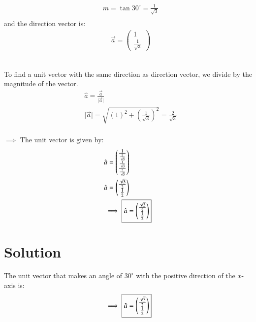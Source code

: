 \documentclass[journal,12pt,twocolumn]{IEEEtran}
\begin{document}
 \begin{align*}
& m = \tan{30^{\circ}} = \frac{1}{\sqrt{3}}\\ 
\end{align*}
and the direction vector is:
 \begin{align*}
& \vec{a}  = \begin{pmatrix} 1 \\ \frac{1}{\sqrt{3}} \end{pmatrix}
\end{align*}


\\


To find a unit vector with the same direction as direction vector, we divide by the magnitude of the vector.
 \begin{align*}
& \hat{a}  = \frac{\vec{a}}{\lvert \vec{a} \rvert}\\
& \lvert \vec{a} \rvert  = \sqrt{ \left( 1 \right)^{\!\!2} +  \left( \frac{1}{\sqrt{3}} \right)^{\!\!2}} = \frac{2}{\sqrt{3}}
\end{align*}
\\
$\implies$ The unit vector is given by:
 \begin{align*}
 & \hat{a}  = \begin{pmatrix}
\frac{1}{\frac{2}{\sqrt{3}}}\\
\frac{\frac{1}{\sqrt{3}}}{\frac{2}{\sqrt{3}}}
\end{pmatrix}\\
& \hat{a}  = \begin{pmatrix}
\frac{\sqrt{3}}{2}\\
\frac{1}{2}
\end{pmatrix}\\
& \implies \boxed{\hat{a}  = \begin{pmatrix}
\frac{\sqrt{3}}{2}\\
\frac{1}{2}
\end{pmatrix}}\\
\end{align*}

\section{Solution}

The unit vector that makes an angle of $30^{\circ}$ with the positive direction of the $x$-axis is:
\begin{align*}
& \implies \boxed{\hat{a}  = \begin{pmatrix}
\frac{\sqrt{3}}{2}\\
\frac{1}{2}
\end{pmatrix}}\\
\end{align*}
\\
\end{document}
